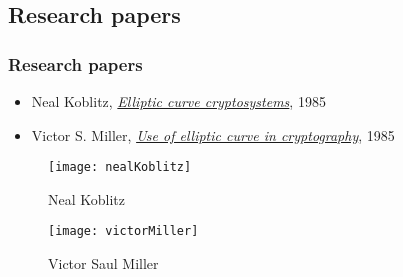 \subsection{Research papers}

\begin{frame}[t]
    \frametitle{Research papers}
    \begin{itemize}
        \item Neal Koblitz, \textit{\underline{Elliptic curve cryptosystems}}, 1985 \cite{Koblitz1985}
        \item Victor S. Miller, \textit{\underline{Use of elliptic curve in cryptography}}, 1985
            \cite{miller_use_1985}
    \end{itemize}
\noindents
\begin{minipage}[t]{0.48\textwidth}
\begin{figure}[h]
    \centering
    \texttt{[image: nealKoblitz]}
    {\caption*{Neal Koblitz}}
\end{figure}
\end{minipage}%
\hfill%
\begin{minipage}[t]{0.5\textwidth}
    \begin{figure}[h]
        \centering
        \texttt{[image: victorMiller]}
        {\caption*{Victor Saul Miller}}
        \label{fig:victorMiller}
    \end{figure}
\end{minipage}
\end{frame}

